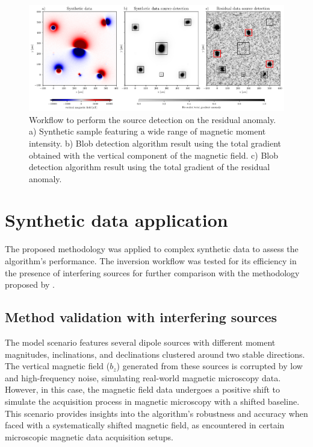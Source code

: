     \begin{figure}[tb!]
      \centering
      \includegraphics[width=1\linewidth]{paper/figures/re-detection-methodology.png}
      \caption{Workflow to perform the source detection on the residual anomaly. a) Synthetic sample featuring a wide range of magnetic moment intensity. b) Blob detection algorithm result using the total gradient obtained with the vertical component of the magnetic field. c) Blob detection algorithm result using the total gradient of the residual anomaly.}
      \label{method-redetection}
    \end{figure}

\section{Synthetic data application}
The proposed methodology was applied to complex synthetic data to assess the algorithm's performance. The inversion workflow was tested for its efficiency in the presence of interfering sources for further comparison with the methodology proposed by  \citet{Souza-Junior2023b}.

\subsection{Method validation with interfering sources}

The model scenario features several dipole sources with different moment magnitudes, inclinations, and declinations clustered around two stable directions. The vertical magnetic field ($b_z$) generated from these sources is corrupted by low and high-frequency noise, simulating real-world magnetic microscopy data. However, in this case, the magnetic field data undergoes a positive shift to simulate the acquisition process in magnetic microscopy with a shifted baseline. This scenario provides insights into the algorithm's robustness and accuracy when faced with a systematically shifted magnetic field, as encountered in certain microscopic magnetic data acquisition setups.

